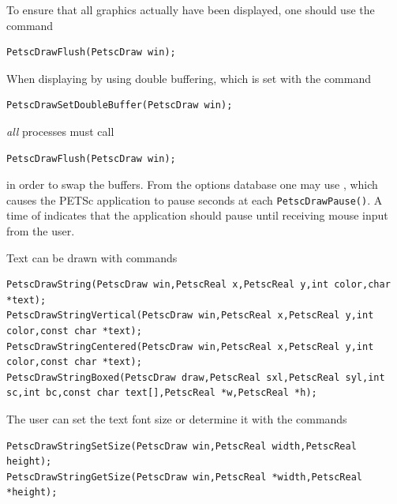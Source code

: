 {{To ensure that all graphics actually have been displayed, one should use
 the
command
\begin{lstlisting}
PetscDrawFlush(PetscDraw win);
\end{lstlisting}
When displaying by using double buffering, which is set with the
command  
\begin{lstlisting}
PetscDrawSetDoubleBuffer(PetscDraw win);
\end{lstlisting}
{\em all} processes must call
\begin{lstlisting}
PetscDrawFlush(PetscDraw win);
\end{lstlisting}
in order to swap the buffers. From the options database one may use
 , which  causes the PETSc application
to pause  seconds at each \lstinline{PetscDrawPause()}. A time of 
indicates that the application should pause until receiving mouse
input from the user.

Text can be drawn with
commands 
\begin{lstlisting}
PetscDrawString(PetscDraw win,PetscReal x,PetscReal y,int color,char *text);
PetscDrawStringVertical(PetscDraw win,PetscReal x,PetscReal y,int color,const char *text);
PetscDrawStringCentered(PetscDraw win,PetscReal x,PetscReal y,int color,const char *text);
PetscDrawStringBoxed(PetscDraw draw,PetscReal sxl,PetscReal syl,int sc,int bc,const char text[],PetscReal *w,PetscReal *h);
\end{lstlisting}
The user can set the text font size or determine it with the
commands
\begin{lstlisting}
PetscDrawStringSetSize(PetscDraw win,PetscReal width,PetscReal height);
PetscDrawStringGetSize(PetscDraw win,PetscReal *width,PetscReal *height);
\end{lstlisting}

}}
